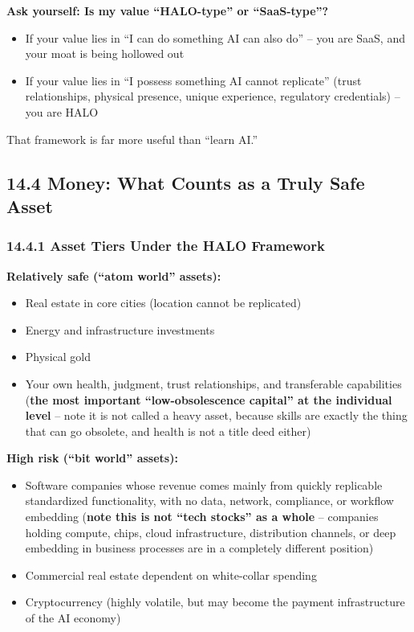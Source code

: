 \documentclass[11pt,a4paper]{article}
\begin{document}
\textbf{Ask yourself: Is my value ``HALO-type'' or ``SaaS-type''?}

\begin{itemize}
  \item If your value lies in ``I can do something AI can also do'' -- you are SaaS, and your moat is being hollowed out
  \item If your value lies in ``I possess something AI cannot replicate'' (trust relationships, physical presence, unique experience, regulatory credentials) -- you are HALO
\end{itemize}

That framework is far more useful than ``learn AI.''

\subsection{14.4 Money: What Counts as a Truly Safe Asset}

\subsubsection{14.4.1 Asset Tiers Under the HALO Framework}

\textbf{Relatively safe (``atom world'' assets):}

\begin{itemize}
  \item Real estate in core cities (location cannot be replicated)
  \item Energy and infrastructure investments
  \item Physical gold
  \item Your own health, judgment, trust relationships, and transferable capabilities (\textbf{the most important ``low-obsolescence capital'' at the individual level} -- note it is not called a heavy asset, because skills are exactly the thing that can go obsolete, and health is not a title deed either)
\end{itemize}

\textbf{High risk (``bit world'' assets):}

\begin{itemize}
  \item Software companies whose revenue comes mainly from quickly replicable standardized functionality, with no data, network, compliance, or workflow embedding (\textbf{note this is not ``tech stocks'' as a whole} -- companies holding compute, chips, cloud infrastructure, distribution channels, or deep embedding in business processes are in a completely different position)
  \item Commercial real estate dependent on white-collar spending
  \item Cryptocurrency (highly volatile, but may become the payment infrastructure of the AI economy)
\end{itemize}
\end{document}

